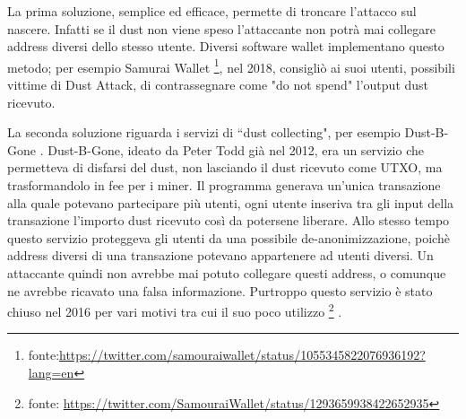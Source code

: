La prima soluzione, semplice ed efficace, permette di troncare l'attacco sul nascere. Infatti se il dust non viene speso l'attaccante non potrà mai collegare address diversi dello stesso utente.  Diversi software wallet implementano questo metodo; per esempio Samurai Wallet \footnote{fonte:\url{https://twitter.com/samouraiwallet/status/1055345822076936192?lang=en}}, nel 2018, consigliò ai suoi utenti, possibili vittime di Dust Attack,  di contrassegnare come "do not spend" l'output dust ricevuto.

La seconda soluzione riguarda i servizi di ``dust collecting", per esempio Dust-B-Gone \cite{Dbg}.
Dust-B-Gone, ideato da Peter Todd già nel 2012, era un servizio che permetteva di disfarsi del dust, non lasciando il dust ricevuto come UTXO, ma trasformandolo in fee per i miner. Il programma generava un'unica transazione alla quale potevano partecipare più utenti, ogni utente inseriva tra gli input della transazione l'importo dust ricevuto così da potersene liberare. Allo stesso tempo questo servizio proteggeva gli utenti da una possibile de-anonimizzazione, poichè address diversi di una transazione potevano appartenere ad utenti diversi. Un attaccante quindi non avrebbe mai potuto collegare questi address, o comunque ne avrebbe ricavato una falsa informazione.
Purtroppo questo servizio è stato chiuso nel 2016 per vari motivi tra cui il suo poco utilizzo \footnote{fonte: \url{https://twitter.com/SamouraiWallet/status/1293659938422652935}} . 